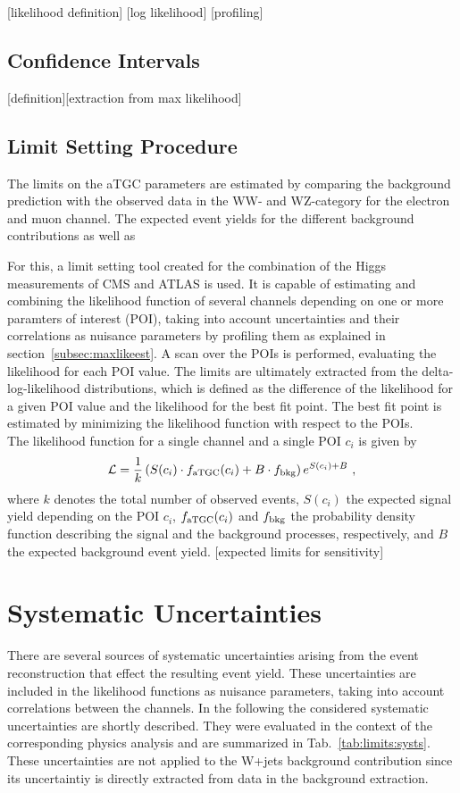 [likelihood definition]
[log likelihood]
[profiling]
\subsection{Confidence Intervals}
[definition][extraction from max likelihood]
\subsection{Limit Setting Procedure}
The limits on the aTGC parameters are estimated by comparing the background prediction with the observed data in the WW- and WZ-category for the electron and muon channel. The expected event yields for the different background contributions as well as 


For this, a limit setting tool created for the combination of the Higgs measurements of CMS and ATLAS \cite{combine} is used. It is capable of estimating and combining the likelihood function of several channels depending on one or more paramters of interest (POI), taking into account uncertainties and their correlations as nuisance parameters  by profiling them as explained in section~\ref{subsec:maxlikeest}. A scan over the POIs is performed, evaluating the likelihood for each POI value.
The limits are ultimately extracted from the delta-log-likelihood distributions, which is defined as the difference of the likelihood for a given POI value and the likelihood for the best fit point. The best fit point is estimated by minimizing the likelihood function with respect to the POIs.\\

\noindent The likelihood function for a single channel and a single POI $c_i$ is given by
\begin{equation}
\mathcal{L} = \frac{1}{k} \left( S(c_i)\cdot f_{\rm aTGC}(c_i) + B \cdot f_{\rm bkg} \right) e^{S(c_i) + B} ~,
\end{equation}
where $k$ denotes the total number of observed events, $S(c_i)$ the expected signal yield depending on the POI $c_i$, $f_{\rm aTGC}(c_i)$ and $f_{\rm bkg}$ the probability density function describing the signal and the background processes, respectively, and $B$ the expected background event yield.
[expected limits for sensitivity]

\section{Systematic Uncertainties}
\label{sec:systematics}
There are several sources of systematic uncertainties arising from the event reconstruction that effect the resulting event yield. These uncertainties are included in the likelihood functions as nuisance parameters, taking into account correlations between the channels. In the following the considered systematic uncertainties are shortly described. They were evaluated in the context of the corresponding physics analysis \cite{PAS} and are summarized in Tab.~\ref{tab:limits:systs}. These uncertainties are not applied to the W+jets background contribution since its uncertaintiy is directly extracted from data in the background extraction.

